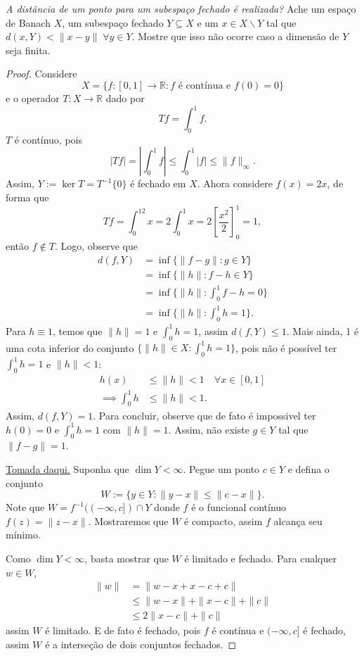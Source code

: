 \documentclass[portuguese]{article}
\theoremstyle{definition}
\newcommand{\R}{\mathbb{R}}
\begin{document}
	\begin{exer*}[12]
		\textit{A distância de um ponto para um subespaço fechado é realizada?} Ache um espaço de Banach $X$, um subespaço fechado $Y\subseteq X$ e um $x\in X\backslash Y$ tal que $d(x,Y)<\| x-y\|\;\forall y\in Y$. Mostre que isso não ocorre caso a dimensão de $Y$ seja finita.
	\end{exer*}
	\begin{proof}
		Considere
		\[X=\{f:[0,1]\to\R: f\text{ é contínua e }f(0)=0\}\]
		e o operador $T:X\to\R$ dado por
		\[Tf=\int_0^1f.\]
		$T$ é contínuo, pois \[|Tf|=\left|\int_0^1f\right|\leq\int_0^1|f|\leq\| f\|_\infty.\]
		Assim, $Y:=\ker T=T^{-1}\{0\}$ é fechado em $X$. Ahora considere $f(x)=2x$, de forma que
		\[Tf=\int_0^12x=2\int_0^1x=2\left[\frac{x^2}{2}\right]^1_0=1,\]
		então $f\notin T$. Logo, observe que
		\begin{align*}
			d(f,Y)&=\inf\{\| f-g\|:g\in Y\}\\
			&=\inf\{\| h\|:f-h\in Y\}\\
			&=\inf\{\| h\|:\int_0^1f-h=0\}\\
			&=\inf\{\| h\|:\int_0^1h=1\}.
		\end{align*}
		Para $h\equiv1$, temos que $\| h\|=1$ e $\int_0^1h=1$, assim $d(f,Y)\leq 1$. Mais ainda, 1 é uma cota inferior do conjunto $\{\| h\|\in X:\int_0^1h=1\}$, pois não é possível ter $\int_0^1h=1$ e $\| h\|<1$:
		\begin{align*}
			h(x)&\leq\| h\|<1\quad\forall x\in[0,1]\\
			\implies \int_0^1h&\leq\| h\|<1.
		\end{align*}
		Assim, $d(f,Y)=1$. Para concluir, observe que de fato é impossivel ter $h(0)=0$ e $\int_0^1h=1$ com $\| h\|=1$. Assim, não existe $g\in Y$ tal que $\| f-g\|=1$.
		
		
		\href{https://www.mathcounterexamples.net/distance-between-a-point-and-a-hyperplane-not-reached/}{Tomada daqui.} Suponha que $\dim Y<\infty$. Pegue um ponto $c\in Y$ e defina o conjunto
		\[W:=\{y\in Y:\| y-x\|\leq\| c-x\|\}.\]
		Note que $W=f^{-1}((-\infty,c])\cap Y$ donde $f$ é o funcional contínuo $f(z)=\| z-x\|$. Mostraremos que $W$ é compacto, assim $f$ alcança seu mínimo.
		
		Como $\dim Y<\infty$, basta mostrar que $W$ é limitado e fechado. Para cualquer $w\in W$,
		\begin{align*}
			\| w\|&=\| w-x+x-c+c\|\\
			&\leq\| w-x\|+\| x-c\|+\| c\|\\
			&\leq 2\| x-c\|+\| c\|
		\end{align*}
		assim $W$ é limitado. E de fato é fechado, pois $f$ é contínua e $(-\infty,c]$ é fechado, assim $W$ é a interseção de dois conjuntos fechados.
	\end{proof}
	
\end{document}
